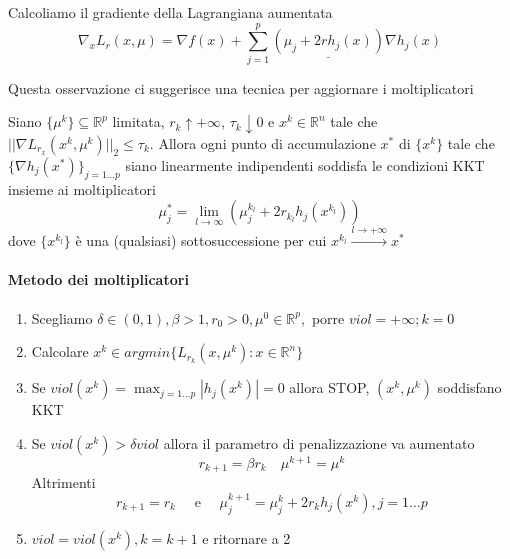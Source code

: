 \begin{observation}
Calcoliamo il gradiente della Lagrangiana aumentata
 $$
 \nabla_{x} L_{r}(x, \mu) = 
 \nabla f(x) + \displaystyle \sum_{j=1}^{p}
 \underline{(\mu_j + 2rh_j(x))}
 \nabla h_j(x)
 $$
\end{observation}
Questa osservazione ci suggerisce una tecnica per
aggiornare i moltiplicatori


\begin{theo}
Siano $\{ \mu^{k} \} \subseteq \mathbb{R}^{p} $ limitata,
$r_k \uparrow + \infty$, $\tau_k \downarrow 0$ e
$x^{k} \in \mathbb{R}^{n}$ tale che $|| \nabla L_{r_{x}}(x^{k}, \mu^{k})||_{2}
\leq \tau_{k} $.
Allora ogni punto di accumulazione $x^{*}$ di $\{ x^{k} \} $ tale che
$\{ \nabla h_j(x^{*})\}_{j=1\ldots p }$ siano  linearmente indipendenti
soddisfa le condizioni KKT insieme ai moltiplicatori
$$\mu_j^{*} = \displaystyle \lim_{l \to \infty} (\mu_j^{k_l} +
 2 r_{k_{l}} h_j(x^{k_l})) $$
dove $\{ x^{k_l}\}$ \`e una (qualsiasi) sottosuccessione per cui
$x^{k_l} \xrightarrow{l \to + \infty} x^{*}$
\end{theo}
\paragraph{Metodo dei moltiplicatori}
\begin{center}
\fbox
{
	\begin{minipage}[position]{0.85\textwidth}
\begin{enumerate}
\item Scegliamo $\delta \in (0,1), \beta > 1,
r_0 > 0, \mu^{0} \in \mathbb{R}^{p},$ porre
$viol= + \infty; k =0$
\item Calcolare  $x^{k}\in argmin\{ L_{r_k}(x, \mu^{k}):
x\in \mathbb{R}^{n} \}$
\item Se $viol(x^{k}) = \displaystyle \max_{j=1\ldots p}  |h_j(x^{k})|  = 0$
  allora STOP, $(x^{k}, \mu^k) $ soddisfano KKT
\item 
  Se $viol(x^{k})> \delta viol$ allora
  il parametro di penalizzazione va aumentato
  \begin{equation}
    \label{eq:bigipenalest01}
 r_{k+1} = \beta r_k \quad \mu^{k+1} = \mu^{k}     
  \end{equation}
Altrimenti
$$r_{k+1}  = r_k \quad \text{ e } \quad
\mu_j^{k+1} = \mu_j^{k} +
2r_k h_j(x^k) , j =1 \ldots p$$
\item $viol = viol(x^{k}), k = k+1$ e ritornare a 2
\end{enumerate}
\end{minipage}
}
\end{center}

